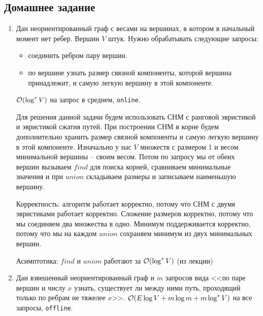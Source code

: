 \subsection{Домашнее задание}
\begin{enumerate}

  \item
    Дан неориентированный граф с весами на вершинах, в котором в начальный момент нет ребер.
    Вершин $V$ штук. Нужно обрабатывать следующие запросы:
    \begin{itemize}
      \item соединить ребром пару вершин.
      \item по вершине узнать размер связной компоненты, которой вершина принадлежит, и самую
            легкую вершину в этой компоненте.
    \end{itemize}
    $\mathcal{O}(\log^* V)$ на запрос в среднем, \texttt{online}.

    \begin{solution}
      Для решения данной задачи будем использовать СНМ с ранговой эвристикой и эвристикой сжатия путей. При построении СНМ в корне будем дополнительно хранить размер связной компоненты и самую легкую вершину в этой компоненте. Изначально у нас $V$ множеств с размером 1 и весом минимальной вершины -- своим весом. Потом по запросу мы от обеих вершин вызываем $find$ для поиска корней, сравниваем минимальные значения и при $union$ складываем размеры и записываем наименьшую вершину.

      Корректность: алгоритм работает корректно, потому что СНМ с двумя эвристиками работает корректно. Сложение размеров корректно, потому что мы соединяем два множества в одно. Минимум поддерживается корректно, потому что мы на каждом $union$ сохраняем минимум из двух минимальных вершин.

      Асимптотика: $find$ и $union$ работают за $\mathcal{O}(\log^* V)$ (из лекции)
    \end{solution}

  \item
    Дан взвешенный неориентированный граф и $m$ запросов вида <<по паре вершин и числу $x$ узнать,
    существует ли между ними путь, проходящий только по ребрам не тяжелее $x$>>.
    $\mathcal{O}(E \log V + m \log m + m \log^* V)$ на все запросы,  \texttt{offline}.
	

\end{enumerate}
